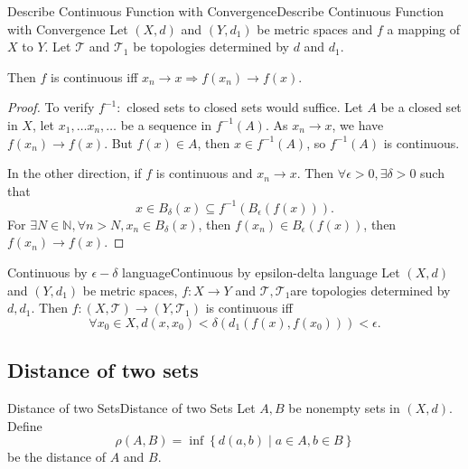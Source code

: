 \documentclass[../main.tex]{subfiles}
\begin{document}
\begin{proposition}{Describe Continuous Function with Convergence}{Describe Continuous Function with Convergence}
Let $(X,d)$ and $(Y,d_1)$ be metric spaces and $f$ a mapping of $X$ to $Y$. Let $\mathcal{T}$ and $\mathcal{T}_1$ be topologies determined by $d$ and $d_1$.

Then $f$ is continuous iff $x_n \rightarrow x \Rightarrow f(x_n) \rightarrow f(x)$.
\end{proposition}
\begin{proof}
To verify $f^{-1}:$ closed sets to closed sets would suffice. Let $A$ be a closed set in $X$, let $x_1, \ldots x_n, \ldots $ be a sequence in $f^{-1}(A)$. As $x_n \rightarrow x$, we have $f(x_n) \rightarrow f(x)$. But $f(x)\in A$, then $x\in f^{-1}(A)$, so $f^{-1}(A)$ is continuous.

In the other direction, if $f$ is continuous and $x_n \rightarrow x$. Then $\forall \epsilon>0, \exists \delta>0$ such that
\begin{equation*}
x\in B_{\delta}(x) \subseteq f^{-1}(B_{\epsilon}(f(x))).
\end{equation*}
For $\exists N\in \mathbb{N}, \forall n>N, x_n \in B_{\delta}(x)$, then $f(x_n)\in B_{\epsilon}(f(x))$, then $f(x_n) \rightarrow f(x)$.
\end{proof}

\begin{corollary}{Continuous by $\epsilon-\delta$ language}{Continuous by epsilon-delta language}
Let $(X,d)$ and $(Y,d_1)$ be metric spaces,  $f: X \rightarrow Y$ and $\mathcal{T},\mathcal{T}_1$are topologies determined by $d,d_1$. Then $f:(X,\mathcal{T}) \rightarrow  (Y,\mathcal{T}_1)$ is continuous iff
\begin{equation*}
\forall x_0\in X, d(x,x_0) <\delta \left(d_1(f(x),f(x_0))\right)<\epsilon.
\end{equation*}
\end{corollary}


\subsection{Distance of two sets}
\begin{definition}{Distance of two Sets}{Distance of two Sets}
Let $A,B$ be nonempty sets in $(X,d)$. Define
\begin{equation}
\rho(A,B) = \inf \left\{ d(a,b)\mid a\in A,b\in B \right\}
\end{equation}
be the distance of $A$ and $B$.
\end{definition}
\end{document}
